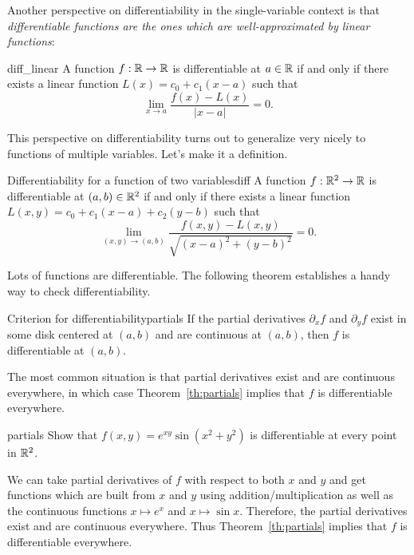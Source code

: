 \documentclass[svgnames]{watsonbook}
\begin{document}
  Another perspective on differentiability in the single-variable
  context is that \textit{differentiable functions are the ones which
    are well-approximated by linear functions}:

  \begin{theo}{}{diff_linear}
    A function $f: \mathbb{R} \to \mathbb{R}$ is differentiable at $a \in \mathbb{R}$ if and
    only if there exists a linear function $L(x) = c_0 + c_1(x-a) $
    such that
    \[
      \lim_{x \to a}\frac{f(x) - L(x)}{|x-a|} = 0. 
    \]
  \end{theo}

  This perspective on differentiability turns out to generalize very
  nicely to functions of multiple variables. Let's make it a
  definition.

  \begin{defn}{Differentiability for a function of two variables}{diff}
    A function $f: \mathbb{R}^2 \to \mathbb{R}$ is differentiable at $(a,b) \in \mathbb{R}^2$
    if and only if there exists a linear function
    $L(x,y) = c_0 + c_{1}(x-a) + c_{2}(y-b)$ such that
    \[
      \lim_{(x,y) \to (a,b)}\frac{f(x,y) - L(x,y)}{\sqrt{(x-a)^2 + (y-b)^2}} = 0. 
    \]
  \end{defn}

  Lots of functions are differentiable. The following theorem
  establishes a handy way to check differentiability. 

  \begin{theo}{Criterion for differentiability}{partials} 
    If the partial derivatives $\partial_x f$ and $\partial_y f$ exist
    in some disk centered at $(a,b)$ and are continuous at $(a,b)$, then
    $f$ is differentiable at $(a,b)$. 
  \end{theo}

  The most common situation is that partial derivatives exist and are
  continuous everywhere, in which case Theorem~\ref{th:partials}
  implies that $f$ is differentiable everywhere.

  \begin{example}{}{partials}
    Show that $f(x,y) = e^{xy} \sin (x^2 + y^2)$ is differentiable at
    every point in $\mathbb{R}^2$. 
  \end{example}

  \begin{solution}
    We can take partial derivatives of $f$ with respect to both $x$
    and $y$ and get functions which are built from $x$ and $y$ using
    addition/multiplication as well as the continuous functions
    $x\mapsto e^x$ and $x\mapsto \sin x$. Therefore, the partial
    derivatives exist and are continuous everywhere. Thus
    Theorem~\ref{th:partials} implies that $f$ is differentiable
    everywhere. 
  \end{solution}
\end{document}
